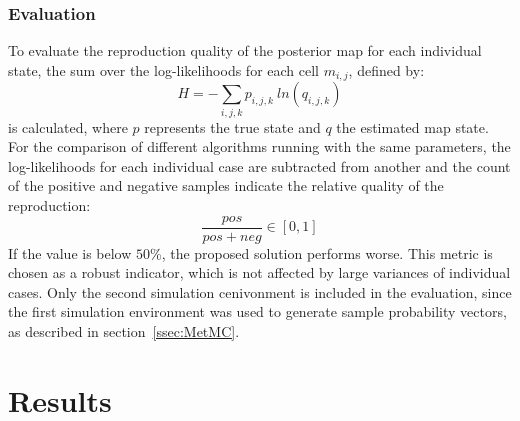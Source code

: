 \documentclass[twocolumn,letterpaper]{IEEEAerospaceCLS}  %
\begin{document}
\subsubsection{Evaluation}\label{ssec:MetEval}
To evaluate the reproduction quality of the posterior map for each individual state, the sum over the log-likelihoods for each cell $m_{i,j}$, defined by:
\begin{equation} \label{eq:Entropy}
    H = - \sum_{i,j,k} p_{i,j,k}~ln(q_{i,j,k})
\end{equation}
is calculated, where $p$ represents the true state and $q$ the estimated map state.\\
For the comparison of different algorithms running with the same parameters, the log-likelihoods for each individual case are subtracted from another and the count of the positive and negative samples indicate the relative quality of the reproduction:
\begin{equation} \label{eq:eval}
    \frac{pos}{pos+neg} \in [0, 1]
\end{equation} If the value is below $50$\%, the proposed solution performs worse. This metric is chosen as a robust indicator, which is not affected by large variances of individual cases. 
Only the second simulation cenivonment is included in the evaluation, since the first simulation environment was used to generate sample probability vectors, as described in section~\ref{ssec:MetMC}.
\section{Results} \label{sec:Res}
\end{document}
